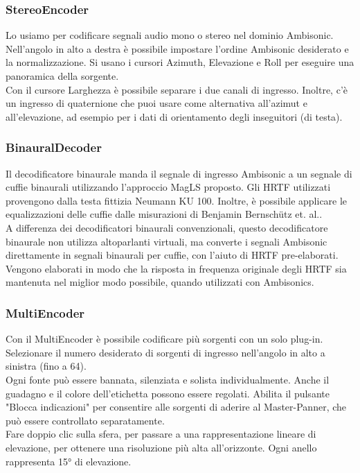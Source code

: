 \subsubsection*{StereoEncoder}

Lo usiamo per codificare segnali audio mono o stereo nel dominio Ambisonic.
Nell'angolo in alto a destra è possibile impostare l'ordine Ambisonic desiderato e la normalizzazione.
Si usano i cursori Azimuth, Elevazione e Roll per eseguire una panoramica della sorgente.\\
Con il cursore Larghezza è possibile separare i due canali di ingresso.
Inoltre, c'è un ingresso di quaternione che puoi usare come alternativa all'azimut e all'elevazione, ad esempio per i dati di orientamento degli inseguitori (di testa).

\subsubsection*{BinauralDecoder}

Il decodificatore binaurale manda il segnale di ingresso Ambisonic a un segnale di cuffie binaurali utilizzando l'approccio MagLS proposto.
 Gli HRTF utilizzati provengono dalla testa fittizia Neumann KU 100. 
 Inoltre, è possibile applicare le equalizzazioni delle cuffie dalle misurazioni di Benjamin Bernschütz et. al..\\
A differenza dei decodificatori binaurali convenzionali, questo decodificatore binaurale non utilizza altoparlanti virtuali, ma converte i segnali Ambisonic direttamente in segnali binaurali per cuffie,
 con l'aiuto di HRTF pre-elaborati.\\
 Vengono elaborati in modo che la risposta in frequenza originale degli HRTF sia mantenuta nel miglior modo possibile, quando utilizzati con Ambisonics.

 \subsubsection*{MultiEncoder}

 Con il MultiEncoder è possibile codificare più sorgenti con un solo plug-in. Selezionare il numero desiderato di sorgenti di ingresso nell'angolo in alto a sinistra (fino a 64).\\
  Ogni fonte può essere bannata, silenziata e solista individualmente. Anche il guadagno e il colore dell'etichetta possono essere regolati.
   Abilita il pulsante "Blocca indicazioni" per consentire alle sorgenti di aderire al Master-Panner, che può essere controllato separatamente.\\
 Fare doppio clic sulla sfera, per passare a una rappresentazione lineare di elevazione, per ottenere una risoluzione più alta all'orizzonte. 
 Ogni anello rappresenta 15° di elevazione.

